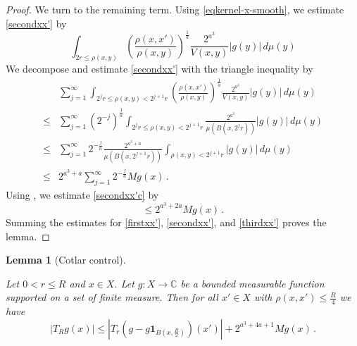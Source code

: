 \documentclass[10pt,a4paper]{article}
\theoremstyle{plain}
\newtheorem{lemma}[theorem]{Lemma}
\theoremstyle{definition}
\numberwithin{equation}{subsection}
\newcommand{\lean}[1]{}
\newcommand{\uses}[1]{}
\newcommand{\leanok}{}
\def\C{\mathbb{C}}
\begin{document}
\begin{proof}
We turn to the remaining term. Using \eqref{eqkernel-x-smooth}, we estimate \eqref{secondxx'} by
\begin{equation}\label{secondxx'b}
 \int_{2r\le\rho(x,y)} \left(\frac{\rho(x,x')}{\rho(x,y)}\right)^{\frac{1}{a}}\frac{2^{a^3}}{V(x,y)} |g(y)| \,d\mu(y)
\end{equation}
We decompose and estimate
\eqref{secondxx'}
with the triangle inequality by
\begin{align}
 &\sum_{j=1}^\infty  \int_{2^jr\le\rho(x,y)< 2^{j+1}r}
 \left(\frac{\rho(x,x')}{\rho(x,y)}\right)^{\frac{1}{a}}\frac{2^{a^3}}{V(x,y)} |g(y)| \,d\mu(y)\, \\
 \le&
 \sum_{j=1}^\infty \left( 2^{-j} \right)^{\frac{1}{a}} \int_{2^jr\le\rho(x,y)< 2^{j+1}r} \frac{2^{a^3}}{\mu(B(x,2^j r))} |g(y)| \,d\mu(y) \\
 \le&
\sum_{j=1}^\infty 2^{-\frac{j}{a}} \frac{2^{a^3 + a}}{\mu(B(x,2^{j+1} r))} \int_{\rho(x,y)<2^{j+1}r}
|g(y)| \, d\mu(y) \\
\label{secondxx'c}
\le& 2^{a^3 + a} \sum_{j=1}^\infty 2^{-\frac{j}{a}} Mg(x)\,.
\end{align}
Using , we estimate
\eqref{secondxx'c} by
\begin{equation}\label{secondxx'd}
\le 2^{a^3 + 2a} Mg(x) \,.
\end{equation}
Summing the estimates
for \eqref{firstxx'},
\eqref{secondxx'}, and
\eqref{thirdxx'}
proves the lemma.
\end{proof}

\begin{lemma}[Cotlar control]
\label{Cotlar-control}
\leanok
\lean{cotlar_control}
\uses{estimate-x-shift}
Let $0<r\le R$ and  $x\in X$. Let $g:X\to\C$ be a bounded measurable function supported on a set of finite measure.
Then for all $x'\in X$ with $\rho(x,x')\le\frac {R}{4}$ we have
\begin{equation}\label{eq-cotlar-control}
\left|T_R g(x)
\right|\le
|T_r(g-g\mathbf{1}_{B(x,\frac {R} 2)})(x')| +
2^{a^3 + 4a + 1} Mg(x)\, .
\end{equation}
\end{lemma}
\end{document}
